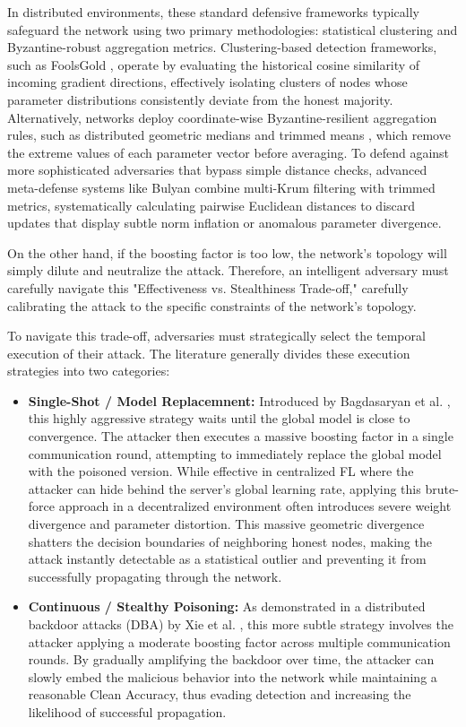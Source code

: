 In distributed environments, these standard defensive frameworks typically safeguard the network using two primary methodologies: statistical clustering and Byzantine-robust aggregation metrics. Clustering-based detection frameworks, such as FoolsGold \cite{fung2020mitigating}, operate by evaluating the historical cosine similarity of incoming gradient directions, effectively isolating clusters of nodes whose parameter distributions consistently deviate from the honest majority. Alternatively, networks deploy coordinate-wise Byzantine-resilient aggregation rules, such as distributed geometric medians and trimmed means \cite{yin2018byzantine}, which remove the extreme values of each parameter vector before averaging. To defend against more sophisticated adversaries that bypass simple distance checks, advanced meta-defense systems like Bulyan \cite{guerraoui2018hidden} combine multi-Krum filtering with trimmed metrics, systematically calculating pairwise Euclidean distances to discard updates that display subtle norm inflation or anomalous parameter divergence.

On the other hand, if the boosting factor is too low, the network's topology will simply dilute and neutralize the attack. Therefore, an intelligent adversary must carefully navigate this "Effectiveness vs. Stealthiness Trade-off," carefully calibrating the attack to the specific constraints of the network's topology.

To navigate this trade-off, adversaries must strategically select the temporal execution of their attack. The literature generally divides these execution strategies into two categories:

\begin{itemize}
    \item \textbf{Single-Shot / Model Replacemnent:} Introduced by Bagdasaryan et al. \cite{bagdasaryan2020how}, this highly aggressive strategy waits until the global model is close to convergence. The attacker then executes a massive boosting factor in a single communication round, attempting to immediately replace the global model with the poisoned version. While effective in centralized FL where the attacker can hide behind the server's global learning rate, applying this brute-force approach in a decentralized environment often introduces severe weight divergence and parameter distortion. This massive geometric divergence shatters the decision boundaries of neighboring honest nodes, making the attack instantly detectable as a statistical outlier and preventing it from successfully propagating through the network.
    \item \textbf{Continuous / Stealthy Poisoning:} As demonstrated in a distributed backdoor attacks (DBA) by Xie et al. \cite{xie2020dba}, this more subtle strategy involves the attacker applying a moderate boosting factor across multiple communication rounds. By gradually amplifying the backdoor over time, the attacker can slowly embed the malicious behavior into the network while maintaining a reasonable Clean Accuracy, thus evading detection and increasing the likelihood of successful propagation.
\end{itemize}

